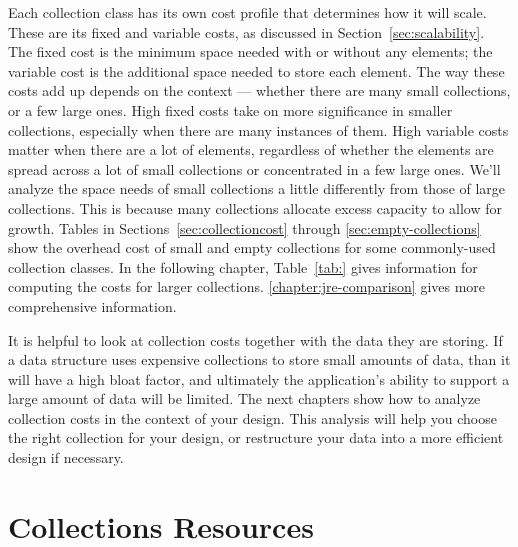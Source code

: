 Each collection class has its own cost
profile that determines how it will scale. These are its fixed and
variable costs, as discussed in Section~\ref{sec:scalability}. 
The fixed cost is the minimum space needed with or
without any elements; the variable cost is the additional space needed to
store each element. The way these costs add up
depends on the context ---
whether there are many small collections, or a few large ones. 
High fixed costs take on more significance in smaller collections,
especially when there are many instances of them. High variable costs matter
when there are a lot of elements, regardless of whether the elements are spread across
a lot of small collections or concentrated in a few large ones.
We'll analyze the space needs of small collections a little differently
from those of large collections. This is because many
collections allocate excess capacity to allow for
growth.  Tables in Sections~\ref{sec:collectioncost} through
\ref{sec:empty-collections}
show the overhead cost of small and empty collections for some commonly-used
collection classes.
In the following chapter, Table~\ref{tab:} gives
information for computing the costs for larger collections.
\autoref{chapter:jre-comparison} gives more comprehensive information.





It is helpful to look at collection costs 
together with the data they are storing. If a data structure uses expensive collections
to store small amounts of data, than it
will have a high bloat factor, and ultimately the application's ability to
support a large amount of data will be limited. The next chapters show
how to analyze collection costs in the context of your design.
This analysis will help you choose the right collection for your design, or
restructure your data into a more efficient design if necessary.


\section{Collections Resources}

